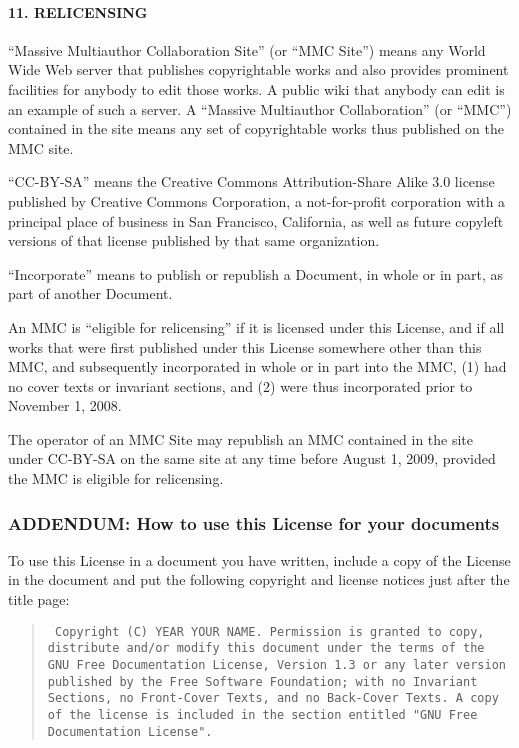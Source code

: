 \hypertarget{relicensing}{%
\paragraph{11. RELICENSING}\label{relicensing}}

``Massive Multiauthor Collaboration Site'' (or ``MMC Site'') means any
World Wide Web server that publishes copyrightable works and also
provides prominent facilities for anybody to edit those works. A public
wiki that anybody can edit is an example of such a server. A ``Massive
Multiauthor Collaboration'' (or ``MMC'') contained in the site means any
set of copyrightable works thus published on the MMC site.

``CC-BY-SA'' means the Creative Commons Attribution-Share Alike 3.0
license published by Creative Commons Corporation, a not-for-profit
corporation with a principal place of business in San Francisco,
California, as well as future copyleft versions of that license
published by that same organization.

``Incorporate'' means to publish or republish a Document, in whole or in
part, as part of another Document.

An MMC is ``eligible for relicensing'' if it is licensed under this
License, and if all works that were first published under this License
somewhere other than this MMC, and subsequently incorporated in whole or
in part into the MMC, (1) had no cover texts or invariant sections, and
(2) were thus incorporated prior to November 1, 2008.

The operator of an MMC Site may republish an MMC contained in the site
under CC-BY-SA on the same site at any time before August 1, 2009,
provided the MMC is eligible for relicensing.

\hypertarget{addendum-how-to-use-this-license-for-your-documents}{%
\subsubsection{ADDENDUM: How to use this License for your
documents}\label{addendum-how-to-use-this-license-for-your-documents}}

To use this License in a document you have written, include a copy of
the License in the document and put the following copyright and license
notices just after the title page:

\begin{quote}
  \texttt{\noindent
    Copyright (C)  YEAR  YOUR NAME.
    Permission is granted to copy, distribute and/or modify this document
    under the terms of the GNU Free Documentation License, Version 1.3
    or any later version published by the Free Software Foundation;
    with no Invariant Sections, no Front-Cover Texts, and no Back-Cover Texts.
    A copy of the license is included in the section entitled "GNU
    Free Documentation License".
  }
\end{quote}

